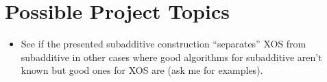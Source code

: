 \section{Possible Project Topics} 
  \begin{itemize} \item See if the presented
      subadditive construction ``separates'' XOS from subadditive in other cases
      where good algorithms for subadditive aren't known but good ones for XOS
      are (ask me for examples).
  \end{itemize}

 



